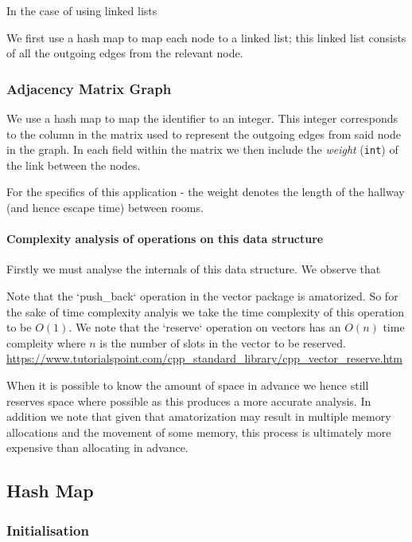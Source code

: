 \documentclass{article}
\begin{document}
In the case of using linked lists

We first use a hash map to map each node to a linked list; this linked list consists of all the outgoing edges from the relevant node.

\subsubsection{Adjacency Matrix Graph}

We use a hash map to map the identifier to an integer. This integer corresponds to the column in the matrix used to represent the outgoing edges from said node in the graph. In each field within the matrix we then include the \textit{weight} (\texttt{int}) of the link between the nodes.

For the specifics of this application - the weight denotes the length of the hallway (and hence escape time) between rooms.

\paragraph{Complexity analysis of operations on this data structure}

Firstly we must analyse the internals of this data structure. We observe that    

Note that the `push_back` operation in the vector package is amatorized. So for the sake of time complexity analyis we take the time complexity of this operation to be $O(1)$. We note that the `reserve` operation on vectors has an $O(n)$ time compleity where $n$ is the number of slots in the vector to be reserved. \url{https://www.tutorialspoint.com/cpp_standard_library/cpp_vector_reserve.htm}

When it is possible to know the amount of space in advance we hence still reserves space where possible as this produces a more accurate analysis. In addition we note that given that amatorization may result in multiple memory allocations and the movement of some memory, this process is ultimately more expensive than allocating in advance.




\subsection{Hash Map}

\subsubsection{Initialisation}
\end{document}
